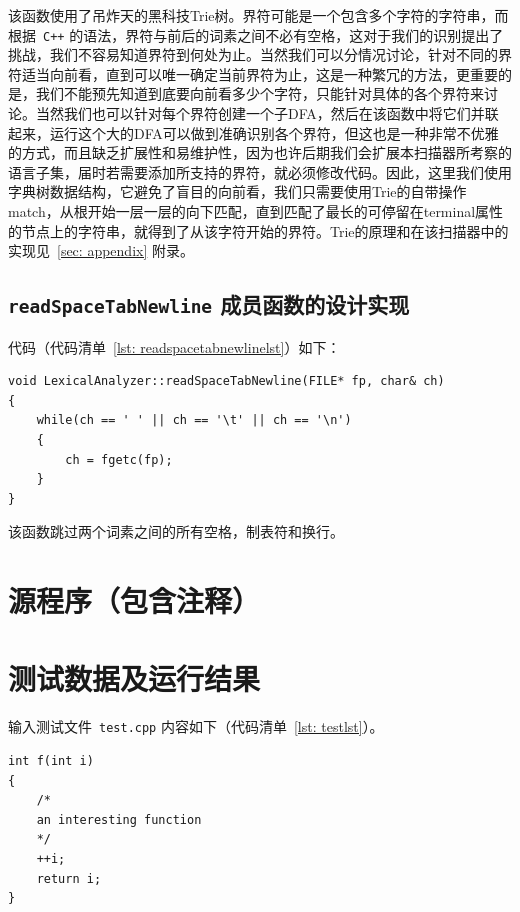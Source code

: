 \documentclass{article}
\begin{document}
\begin{CJK*}{UTF8}{gbsn}
该函数使用了吊炸天的黑科技Trie树。界符可能是一个包含多个字符的字符串，而根据~\texttt{C++} 的语法，界符与前后的词素之间不必有空格，这对于我们的识别提出了挑战，我们不容易知道界符到何处为止。当然我们可以分情况讨论，针对不同的界符适当向前看，直到可以唯一确定当前界符为止，这是一种繁冗的方法，更重要的是，我们不能预先知道到底要向前看多少个字符，只能针对具体的各个界符来讨论。当然我们也可以针对每个界符创建一个子DFA，然后在该函数中将它们并联起来，运行这个大的DFA可以做到准确识别各个界符，但这也是一种非常不优雅的方式，而且缺乏扩展性和易维护性，因为也许后期我们会扩展本扫描器所考察的语言子集，届时若需要添加所支持的界符，就必须修改代码。因此，这里我们使用字典树数据结构，它避免了盲目的向前看，我们只需要使用Trie的自带操作match，从根开始一层一层的向下匹配，直到匹配了最长的可停留在terminal属性的节点上的字符串，就得到了从该字符开始的界符。Trie的原理和在该扫描器中的实现见~\ref{sec: appendix} 附录。



\subsection{\texttt{readSpaceTabNewline} 成员函数的设计实现}
代码（代码清单~\ref{lst: readspacetabnewlinelst}）如下：
\begin{center}
\begin{lstlisting}[caption = {\texttt{readSpaceTabNewline} 成员函数代码清单}, label = {lst: readspacetabnewlinelst}]
void LexicalAnalyzer::readSpaceTabNewline(FILE* fp, char& ch)
{
	while(ch == ' ' || ch == '\t' || ch == '\n')
	{
		ch = fgetc(fp);
	}
}
\end{lstlisting}
\end{center}

该函数跳过两个词素之间的所有空格，制表符和换行。

\section{源程序（包含注释）}


\section{测试数据及运行结果}
输入测试文件~\texttt{test.cpp} 内容如下（代码清单~\ref{lst: testlst}）。
\begin{center}
\begin{lstlisting}[caption = {\texttt{test.txt} 关键字清单}, label = {lst: testlst}]
int f(int i)
{
	/*
	an interesting function
	*/
	++i;
	return i;
}


\end{lstlisting}
\end{center}
\end{CJK*}
\end{document}
